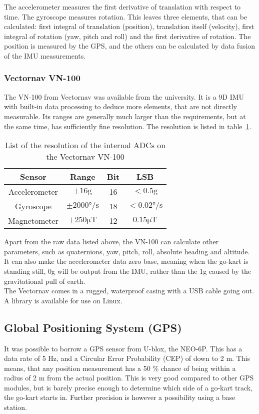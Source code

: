 The accelerometer measures the first derivative of translation with respect to time. 
The gyroscope measures rotation.
This leaves three elements, that can be calculated: first integral of translation (position), translation itself (velocity), first integral of rotation (yaw, pitch and roll) and the first derivative of rotation.
The position is measured by the GPS, and the others can be calculated by data fusion of the IMU measurements.\\

\subsubsection*{Vectornav VN-100}
The VN-100 from Vectornav was available from the university.
It is a 9D IMU with built-in data processing to deduce more elements, that are not directly measurable.
Its ranges are generally much larger than the requirements, but at the same time, has sufficiently fine resolution.
The resolution is listed in table~\ref{tab:vectornav_measurement_resolution}.

\begin{table}
	\centering
	\begin{tabular}{ c | c c c}
		{\textbf{Sensor}} & {\textbf{Range}} & {\textbf{Bit}} & {\textbf{LSB}}\\
		\hline
		{Accelerometer}	& { $\pm 16 \mathrm{g}$}					& {16}	& {$< 0.5 \mathrm{g}$}\\
		{Gyroscope}		& { $\pm 2000\si{\degree \per \second}$ }	& {18}	& {$<0.02 \si{\degree \per \second}$}\\
		{Magnetometer}	& { $\pm 250 \si{\micro \tesla}$}			& {12}	& {$0.15 \si{\micro \tesla}$}
	\end{tabular}
	\caption{List of the resolution of the internal ADCs on the Vectornav VN-100}
	\label{tab:vectornav_measurement_resolution}
\end{table}

Apart from the raw data listed above, the VN-100 can calculate other parameters, such as quaternions, yaw, pitch, roll, absolute heading and altitude.
It can also make the accelerometer data zero base, meaning when the go-kart is standing still, 0g will be output from the IMU, rather than the 1g caused by the gravitational pull of earth. \\

The Vectornav comes in a rugged, waterproof casing with a USB cable going out.
A library is available for use on Linux.

\subsection{Global Positioning System (GPS)}
It was possible to borrow a GPS sensor from U-blox, the NEO-6P.
This has a data rate of 5 Hz, and a Circular Error Probability (CEP) of down to 2 m.
This means, that any position measurement has a 50 \% chance of being within a radius of 2 m from the actual position. 
This is very good compared to other GPS modules, but is barely precise enough to determine which side of a go-kart track, the go-kart starts in. 
Further precision is however a possibility using a base station.\\

